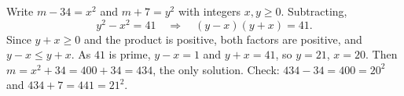 Write $m-34=x^2$ and $m+7=y^2$ with integers $x,y\ge0$. Subtracting,
\[
y^2-x^2=41\quad\Longrightarrow\quad(y-x)(y+x)=41 .
\]
Since $y+x\ge0$ and the product is positive, both factors are positive, and $y-x\le y+x$. As $41$ is prime, $y-x=1$ and $y+x=41$, so $y=21$, $x=20$. Then $m=x^2+34=400+34=\boxed{434}$, the only solution. Check: $434-34=400=20^2$ and $434+7=441=21^2$.

